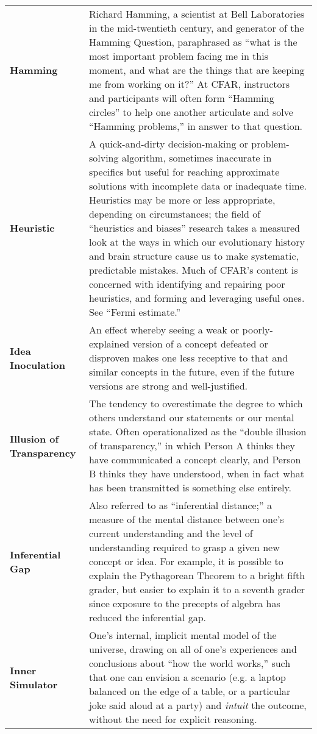 \begin{longtable} { p{} p{} }
\textbf{Hamming} & Richard Hamming, a scientist at Bell Laboratories in the mid-twentieth century, and generator of the Hamming Question, paraphrased as ``what is the most important problem facing me in this moment, and what are the things that are keeping me from working on it?''  At CFAR, instructors and participants will often form ``Hamming circles'' to help one another articulate and solve ``Hamming problems,'' in answer to that question.\\

\textbf{Heuristic} & A quick-and-dirty decision-making or problem-solving algorithm, sometimes inaccurate in specifics but useful for reaching approximate solutions with incomplete data or inadequate time.  Heuristics may be more or less appropriate, depending on circumstances; the field of ``heuristics and biases'' research takes a measured look at the ways in which our evolutionary history and brain structure cause us to make systematic, predictable mistakes.  Much of CFAR's content is concerned with identifying and repairing poor heuristics, and forming and leveraging useful ones.  See ``Fermi estimate.''\\

\textbf{Idea Inoculation} & An effect whereby seeing a weak or poorly-explained version of a concept defeated or disproven makes one less receptive to that and similar concepts in the future, even if the future versions are strong and well-justified.\\

\textbf{Illusion of Transparency} & The tendency to overestimate the degree to which others understand our statements or our mental state.  Often operationalized as the ``double illusion of transparency,'' in which Person A thinks they have communicated a concept clearly, and Person B thinks they have understood, when in fact what has been transmitted is something else entirely.\\

\textbf{Inferential Gap} & Also referred to as ``inferential distance;'' a measure of the mental distance between one's current understanding and the level of understanding required to grasp a given new concept or idea.  For example, it is possible to explain the Pythagorean Theorem to a bright fifth grader, but easier to explain it to a seventh grader since exposure to the precepts of algebra has reduced the inferential gap.\\

\textbf{Inner Simulator} & One's internal, implicit mental model of the universe, drawing on all of one's experiences and conclusions about ``how the world works,'' such that one can envision a scenario (e.g. a laptop balanced on the edge of a table, or a particular joke said aloud at a party) and \emph{intuit} the outcome, without the need for explicit reasoning.\\


\end{longtable}
